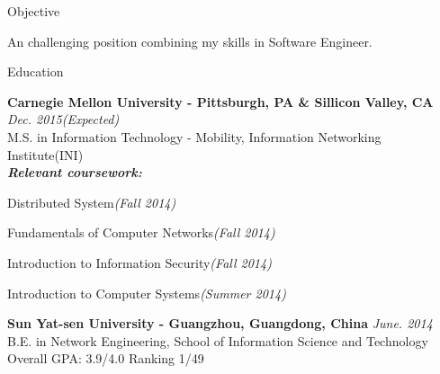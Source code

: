 \documentclass{resume} %
\begin{document}
\begin{rSection}{Objective}

An challenging position combining my skills in Software Engineer.

\end{rSection}


\begin{rSection}{Education}

{\bf Carnegie Mellon University - Pittsburgh, PA \& Sillicon Valley, CA} \hfill {\em Dec. 2015(Expected)} \\ 
M.S. in Information Technology - Mobility, Information Networking Institute(INI) \\
{\bf\em Relevant coursework:}
\begin{inparaenum}[\itshape 1\upshape)]
\item Distributed System{\em(Fall 2014)}
\item Fundamentals of Computer Networks{\em(Fall 2014)}
\item Introduction to Information Security{\em(Fall 2014)}
\item Introduction to Computer Systems{\em(Summer 2014)}
\end{inparaenum}


{\bf Sun Yat-sen University - Guangzhou, Guangdong, China} \hfill {\em June. 2014} \\ 
B.E. in Network Engineering, 
School of Information Science and Technology \\
Overall GPA: 3.9/4.0 Ranking 1/49

\end{rSection}
\end{document}
